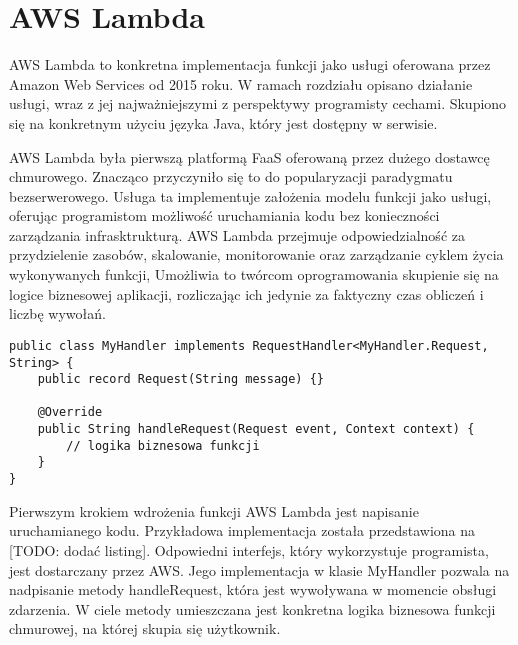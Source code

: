 \section{AWS Lambda}\label{chapter:aws_lambda}

AWS Lambda to konkretna implementacja funkcji jako usługi oferowana przez Amazon Web Services od 2015 roku.
W ramach rozdziału opisano działanie usługi, wraz z jej najważniejszymi z perspektywy programisty cechami.
Skupiono się na konkretnym użyciu języka Java, który jest dostępny w serwisie.

AWS Lambda była pierwszą platformą FaaS oferowaną przez dużego dostawcę chmurowego.
Znacząco przyczyniło się to do popularyzacji paradygmatu bezserwerowego.
Usługa ta implementuje założenia modelu funkcji jako usługi, oferując programistom możliwość uruchamiania kodu bez konieczności zarządzania infrasktrukturą.
AWS Lambda przejmuje odpowiedzialność za przydzielenie zasobów, skalowanie, monitorowanie oraz zarządzanie cyklem życia wykonywanych funkcji,
Umożliwia to twórcom oprogramowania skupienie się na logice biznesowej aplikacji, rozliczając ich jedynie za faktyczny czas obliczeń i liczbę wywołań.

\begin{lstlisting}[caption={Przykładowa implementacja funkcji AWS Lambda w języku Java [źródło: opracowanie własne]} label={code:example_aws_lambda}]
public class MyHandler implements RequestHandler<MyHandler.Request, String> {
    public record Request(String message) {}

    @Override
    public String handleRequest(Request event, Context context) {
        // logika biznesowa funkcji
    }
}
\end{lstlisting}

Pierwszym krokiem wdrożenia funkcji AWS Lambda jest napisanie uruchamianego kodu.
Przykładowa implementacja została przedstawiona na [TODO: dodać listing]. 
Odpowiedni interfejs, który wykorzystuje programista, jest dostarczany przez AWS.
Jego implementacja w klasie MyHandler pozwala na nadpisanie metody handleRequest, która jest wywoływana w momencie obsługi zdarzenia.
W ciele metody umieszczana jest konkretna logika biznesowa funkcji chmurowej, na której skupia się użytkownik.







